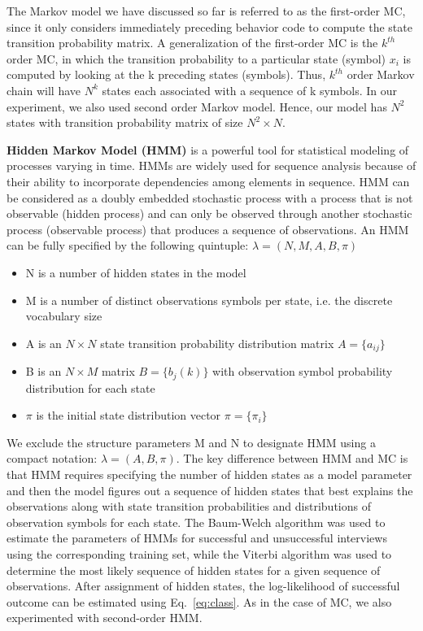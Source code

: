 \documentclass{amia}
\begin{document}
The Markov model we have discussed so far is referred to as the first-order MC, since it only considers immediately preceding behavior code to compute the state transition probability matrix. A generalization of the first-order MC is the $k^{th}$ order MC, in which the transition probability to a particular state (symbol) $x_i$ is computed by looking at the k preceding states (symbols). Thus, $k^{th}$ order Markov chain will have $N^{k}$ states each associated with a sequence of k symbols. In our experiment, we also used second order Markov model. Hence, our model has $N^2$ states with transition probability matrix of size $N^2 \times N$.  

\textbf {Hidden Markov Model (HMM)} is a powerful tool for statistical modeling of processes varying in time. HMMs are widely used for sequence analysis because of their ability to incorporate dependencies among elements in sequence. HMM can be considered as a doubly embedded stochastic process with a process that is not observable (hidden process) and can only be observed through another stochastic process (observable process) that produces a sequence of observations. An HMM can be fully specified by the following quintuple: $\lambda = (N, M, A, B, \pi)$

\begin{itemize}
\item N is a number of hidden states in the model
\item M is a number of distinct observations symbols per state, i.e. the discrete vocabulary size
\item A is an $N\times N$ state transition probability distribution matrix $A = \{a_{ij}\}$
\item B is an $N\times M$ matrix $B = \{b_j(k)\}$ with observation symbol probability distribution for each state 
\item $\pi$ is the initial state distribution vector $\pi = \{\pi_i\}$
\end{itemize}

We exclude the structure parameters M and N to designate HMM using a compact notation: $\lambda = (A, B, \pi)$. The key difference between HMM and MC is that HMM requires specifying the number of hidden states as a model parameter and then the model figures out a sequence of hidden states that best explains the observations along with state transition probabilities and distributions of observation symbols for each state. The Baum-Welch algorithm was used to estimate the parameters of HMMs for successful and unsuccessful interviews using the corresponding training set, while the Viterbi algorithm was used to determine the most likely sequence of hidden states for a given sequence of observations. After assignment of hidden states, the log-likelihood of successful outcome can be estimated using Eq.~\ref{eq:class}. As in the case of MC, we also experimented with second-order HMM.   
\end{document}

